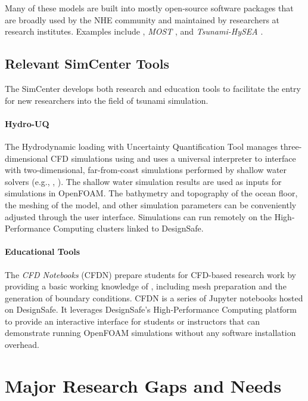 Many of these models are built into mostly open-source software packages that are broadly used by the NHE community and maintained by researchers at research institutes. Examples include   \citep{berger2011geoclaw}, \emph{MOST} \citep{titov1997implementation}, and \emph{Tsunami-HySEA}  \citep{macias2016comparison}.

\subsection{Relevant SimCenter Tools}

The SimCenter develops both research and education tools to facilitate the entry for new researchers into the field of tsunami simulation.

\paragraph{Hydro-UQ} The Hydrodynamic loading with Uncertainty Quantification Tool  manages three-dimensional CFD simulations using  and uses a universal interpreter to interface with two-dimensional, far-from-coast simulations performed by shallow water solvers (e.g., , ). The shallow water simulation results are used as inputs for simulations in OpenFOAM. The bathymetry and topography of the ocean floor, the meshing of the model, and other simulation parameters can be conveniently adjusted through the user interface. Simulations can run remotely on the High-Performance Computing clusters linked to DesignSafe.

\paragraph{Educational Tools} The \emph{CFD Notebooks} (CFDN) prepare students for CFD-based research work by providing a basic working knowledge of , including mesh preparation and the generation of boundary conditions. CFDN is a series of Jupyter notebooks hosted on DesignSafe. It leverages DesignSafe's High-Performance Computing platform to provide an interactive interface for students or instructors that can demonstrate running OpenFOAM simulations without any software installation overhead.

\section{Major Research Gaps and Needs}
\label{sec:tsunami_gaps}

